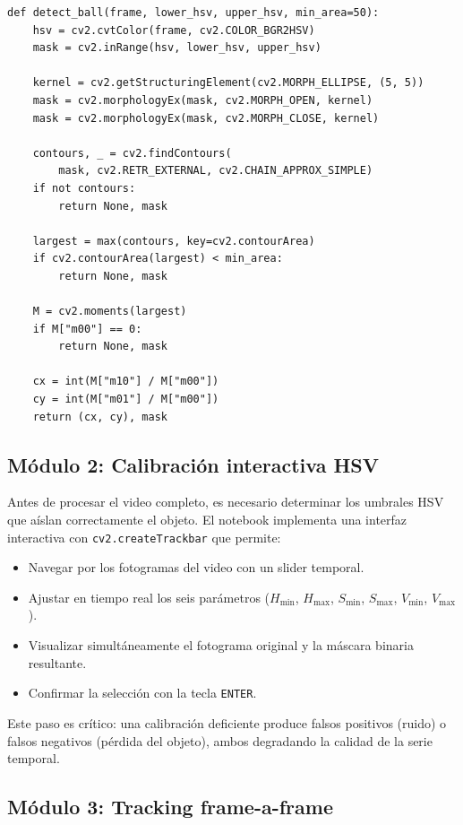 \documentclass[12pt,a4paper]{article}
\begin{document}
\begin{lstlisting}[caption={Función de detección del objeto.}]
def detect_ball(frame, lower_hsv, upper_hsv, min_area=50):
    hsv = cv2.cvtColor(frame, cv2.COLOR_BGR2HSV)
    mask = cv2.inRange(hsv, lower_hsv, upper_hsv)

    kernel = cv2.getStructuringElement(cv2.MORPH_ELLIPSE, (5, 5))
    mask = cv2.morphologyEx(mask, cv2.MORPH_OPEN, kernel)
    mask = cv2.morphologyEx(mask, cv2.MORPH_CLOSE, kernel)

    contours, _ = cv2.findContours(
        mask, cv2.RETR_EXTERNAL, cv2.CHAIN_APPROX_SIMPLE)
    if not contours:
        return None, mask

    largest = max(contours, key=cv2.contourArea)
    if cv2.contourArea(largest) < min_area:
        return None, mask

    M = cv2.moments(largest)
    if M["m00"] == 0:
        return None, mask

    cx = int(M["m10"] / M["m00"])
    cy = int(M["m01"] / M["m00"])
    return (cx, cy), mask
\end{lstlisting}

\subsection{Módulo 2: Calibración interactiva HSV}

Antes de procesar el video completo, es necesario determinar los umbrales HSV que aíslan correctamente el objeto. El notebook implementa una interfaz interactiva con \texttt{cv2.createTrackbar} que permite:

\begin{itemize}
    \item Navegar por los fotogramas del video con un slider temporal.
    \item Ajustar en tiempo real los seis parámetros ($H_{\min}$, $H_{\max}$, $S_{\min}$, $S_{\max}$, $V_{\min}$, $V_{\max}$).
    \item Visualizar simultáneamente el fotograma original y la máscara binaria resultante.
    \item Confirmar la selección con la tecla \texttt{ENTER}.
\end{itemize}

Este paso es crítico: una calibración deficiente produce falsos positivos (ruido) o falsos negativos (pérdida del objeto), ambos degradando la calidad de la serie temporal.

\subsection{Módulo 3: Tracking frame-a-frame}
\end{document}

